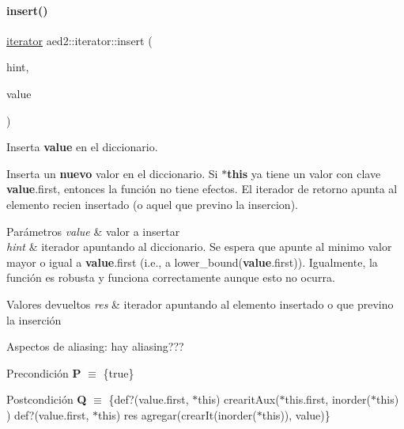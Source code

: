 \paragraph{\texorpdfstring{insert()}{insert()}\hspace{0.1cm}{\footnotesize\ttfamily [1/2]}}
{\footnotesize\ttfamily \hyperlink{classaed2_1_1iterator_1_1iterator}{iterator} aed2\+::iterator\+::insert (\begin{DoxyParamCaption}\item[{\hyperlink{classaed2_1_1iterator_1_1const__iterator}{const\+\_\+iterator}}]{hint,  }\item[{const \hyperlink{classaed2_1_1iterator_a6411a2c08b2b7c52f063bef1a168acb6_a6411a2c08b2b7c52f063bef1a168acb6}{value\+\_\+type} \&}]{value }\end{DoxyParamCaption})\hspace{0.3cm}{\ttfamily [inline]}}



Inserta {\bfseries value} en el diccionario. 

Inserta un {\bfseries nuevo} valor en el diccionario. Si {\bfseries $\ast$this} ya tiene un valor con clave {\bfseries value}.first, entonces la función no tiene efectos. El iterador de retorno apunta al elemento recien insertado (o aquel que previno la insercion).


\begin{DoxyParams}{Parámetros}
{\em value} & valor a insertar \\
\hline
{\em hint} & iterador apuntando al diccionario. Se espera que apunte al minimo valor mayor o igual a {\bfseries value}.first (i.\+e., a lower\+\_\+bound({\bfseries value}.first)). Igualmente, la función es robusta y funciona correctamente aunque esto no ocurra. \\
\hline
\end{DoxyParams}

\begin{DoxyRetVals}{Valores devueltos}
{\em res} & iterador apuntando al elemento insertado o que previno la inserción\\
\hline
\end{DoxyRetVals}
\begin{DoxyParagraph}{Aspectos de aliasing\+:}
hay aliasing???
\end{DoxyParagraph}
\begin{DoxyPrecond}{Precondición}
{\bfseries P} $\equiv$ \{true\} 
\end{DoxyPrecond}
\begin{DoxyPostcond}{Postcondición}
{\bfseries Q} $\equiv$ \{def?(value.\+first, $\ast$this)  crearit\+Aux($\ast$this.first, inorder($\ast$this) )   def?(value.\+first, $\ast$this)  res  agregar(crear\+It(inorder($\ast$this)), value)\}
\end{DoxyPostcond}

